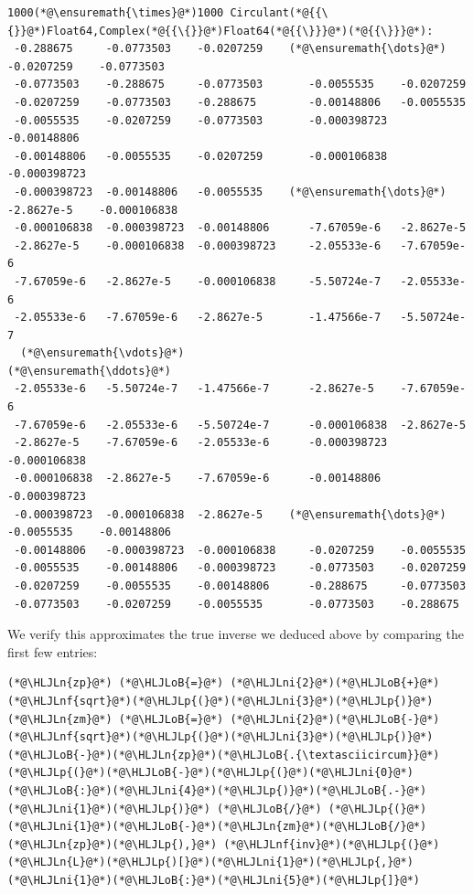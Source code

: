 \documentclass[12pt,a4paper]{article}
\newcommand{\HLJLn}[1]{#1}
\newcommand{\HLJLnf}[1]{\textcolor[RGB]{66,102,213}{#1}}
\newcommand{\HLJLni}[1]{\textcolor[RGB]{59,151,46}{#1}}
\newcommand{\HLJLoB}[1]{\textcolor[RGB]{102,102,102}{\textbf{#1}}}
\newcommand{\HLJLp}[1]{#1}
\begin{document}
\begin{lstlisting}
1000(*@\ensuremath{\times}@*)1000 Circulant(*@{{\{}}@*)Float64,Complex(*@{{\{}}@*)Float64(*@{{\}}}@*)(*@{{\}}}@*):
 -0.288675     -0.0773503    -0.0207259    (*@\ensuremath{\dots}@*)  -0.0207259    -0.0773503
 -0.0773503    -0.288675     -0.0773503       -0.0055535    -0.0207259
 -0.0207259    -0.0773503    -0.288675        -0.00148806   -0.0055535
 -0.0055535    -0.0207259    -0.0773503       -0.000398723  -0.00148806
 -0.00148806   -0.0055535    -0.0207259       -0.000106838  -0.000398723
 -0.000398723  -0.00148806   -0.0055535    (*@\ensuremath{\dots}@*)  -2.8627e-5    -0.000106838
 -0.000106838  -0.000398723  -0.00148806      -7.67059e-6   -2.8627e-5
 -2.8627e-5    -0.000106838  -0.000398723     -2.05533e-6   -7.67059e-6
 -7.67059e-6   -2.8627e-5    -0.000106838     -5.50724e-7   -2.05533e-6
 -2.05533e-6   -7.67059e-6   -2.8627e-5       -1.47566e-7   -5.50724e-7
  (*@\ensuremath{\vdots}@*)                                        (*@\ensuremath{\ddots}@*)                
 -2.05533e-6   -5.50724e-7   -1.47566e-7      -2.8627e-5    -7.67059e-6
 -7.67059e-6   -2.05533e-6   -5.50724e-7      -0.000106838  -2.8627e-5
 -2.8627e-5    -7.67059e-6   -2.05533e-6      -0.000398723  -0.000106838
 -0.000106838  -2.8627e-5    -7.67059e-6      -0.00148806   -0.000398723
 -0.000398723  -0.000106838  -2.8627e-5    (*@\ensuremath{\dots}@*)  -0.0055535    -0.00148806
 -0.00148806   -0.000398723  -0.000106838     -0.0207259    -0.0055535
 -0.0055535    -0.00148806   -0.000398723     -0.0773503    -0.0207259
 -0.0207259    -0.0055535    -0.00148806      -0.288675     -0.0773503
 -0.0773503    -0.0207259    -0.0055535       -0.0773503    -0.288675
\end{lstlisting}


We verify this approximates the true inverse we deduced above by comparing the first few entries:


\begin{lstlisting}
(*@\HLJLn{zp}@*) (*@\HLJLoB{=}@*) (*@\HLJLni{2}@*)(*@\HLJLoB{+}@*)(*@\HLJLnf{sqrt}@*)(*@\HLJLp{(}@*)(*@\HLJLni{3}@*)(*@\HLJLp{)}@*)
(*@\HLJLn{zm}@*) (*@\HLJLoB{=}@*) (*@\HLJLni{2}@*)(*@\HLJLoB{-}@*)(*@\HLJLnf{sqrt}@*)(*@\HLJLp{(}@*)(*@\HLJLni{3}@*)(*@\HLJLp{)}@*)
(*@\HLJLoB{-}@*)(*@\HLJLn{zp}@*)(*@\HLJLoB{.{\textasciicircum}}@*)(*@\HLJLp{(}@*)(*@\HLJLoB{-}@*)(*@\HLJLp{(}@*)(*@\HLJLni{0}@*)(*@\HLJLoB{:}@*)(*@\HLJLni{4}@*)(*@\HLJLp{)}@*)(*@\HLJLoB{.-}@*)(*@\HLJLni{1}@*)(*@\HLJLp{)}@*) (*@\HLJLoB{/}@*) (*@\HLJLp{(}@*)(*@\HLJLni{1}@*)(*@\HLJLoB{-}@*)(*@\HLJLn{zm}@*)(*@\HLJLoB{/}@*)(*@\HLJLn{zp}@*)(*@\HLJLp{),}@*) (*@\HLJLnf{inv}@*)(*@\HLJLp{(}@*)(*@\HLJLn{L}@*)(*@\HLJLp{)[}@*)(*@\HLJLni{1}@*)(*@\HLJLp{,}@*)(*@\HLJLni{1}@*)(*@\HLJLoB{:}@*)(*@\HLJLni{5}@*)(*@\HLJLp{]}@*)
\end{lstlisting}
\end{document}

